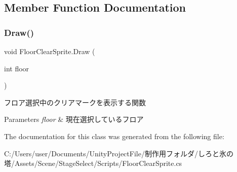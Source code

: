 \subsection{Member Function Documentation}
\mbox{\label{class_floor_clear_sprite_aff9b6239db40f5f9e25601bf6562fbbc}} 
\subsubsection{\texorpdfstring{Draw()}{Draw()}}
{\footnotesize\ttfamily void Floor\+Clear\+Sprite.\+Draw (\begin{DoxyParamCaption}\item[{int}]{floor }\end{DoxyParamCaption})\hspace{0.3cm}{\ttfamily [inline]}}



フロア選択中のクリアマークを表示する関数 


\begin{DoxyParams}{Parameters}
{\em floor} & 現在選択しているフロア\\
\hline
\end{DoxyParams}


The documentation for this class was generated from the following file\+:\begin{DoxyCompactItemize}
\item 
C\+:/\+Users/user/\+Documents/\+Unity\+Project\+File/制作用フォルダ/しろと氷の塔/\+Assets/\+Scene/\+Stage\+Select/\+Scripts/Floor\+Clear\+Sprite.\+cs\end{DoxyCompactItemize}
